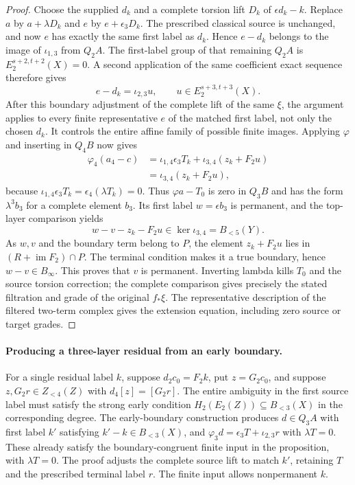 \begin{proof}
Choose the supplied $d_k$ and a complete torsion lift $D_k$ of
$\epsilon d_k-k$. Replace $a$ by $a+\lambda D_k$ and $e$ by
$e+\epsilon_3D_k$. The prescribed classical source is unchanged, and
now $e$ has exactly the same first label as $d_k$. Hence $e-d_k$ belongs
to the image of $\iota_{1,3}$ from $Q_2A$.
The first-label group of that remaining $Q_2A$ is
$E_2^{s+2,t+2}(X)=0$. A second application of the same coefficient
exact sequence therefore gives
\[
 e-d_k=\iota_{2,3}u,\qquad u\in E_2^{s+3,t+3}(X).
\]
After this boundary adjustment of the complete lift of the same $\xi$,
the argument applies to every finite representative $e$ of the matched
first label, not only the chosen $d_k$. It controls the entire affine
family of possible finite images.
Applying $\varphi$ and inserting in $Q_4B$ now gives
\[
 \begin{split}
 \varphi_4(a_4-c)
 &=\iota_{1,4}\epsilon_3T_k
   +\iota_{3,4}(z_k+F_2u)\\
 &=\iota_{3,4}(z_k+F_2u),
 \end{split}
\]
because $\iota_{1,4}\epsilon_3T_k=\epsilon_4(\lambda T_k)=0$.
Thus $\varphi a-T_0$ is zero in $Q_3B$ and has the form
$\lambda^3b_3$ for a complete element $b_3$.
Its first label $w=\epsilon b_3$ is permanent, and the top-layer
comparison yields
\[
 w-v-z_k-F_2u\in\ker\iota_{3,4}=B_{<5}(Y).
\]
As $w,v$ and the boundary term belong to $P$, the element
$z_k+F_2u$ lies in $\left(R+\operatorname{im}F_2\right)\cap P$.
The terminal condition makes it a true boundary, hence $w-v\in B_\infty$.
This proves that $v$ is permanent. Inverting lambda kills $T_0$ and the
source torsion correction; the complete comparison gives precisely the
stated filtration and grade of the original $f_*\xi$. The representative
description of the filtered two-term complex gives the extension equation,
including zero source or target grades.
\end{proof}


\paragraph{Producing a three-layer residual from an early boundary.}
For a single residual label $k$, suppose
$d_2c_0=F_2k$, put $z=G_2c_0$, and suppose
$z,G_2r\in Z_{<4}(Z)$ with $d_4[z]=[G_2r]$.
The entire ambiguity in the first source label must satisfy the strong early condition
$H_2(E_2(Z))\subseteq B_{<3}(X)$ in the corresponding degree.
The early-boundary construction produces $d\in Q_3A$ with
first label $k'$ satisfying $k'-k\in B_{<3}(X)$, and
$\varphi_3d=\epsilon_3T+\iota_{2,3}r$ with $\lambda T=0$.
These already satisfy the boundary-congruent finite input in the
proposition, with $\lambda T=0$. The proof adjusts the complete source lift to match $k'$, retaining $T$
and the prescribed terminal label $r$. The finite input allows
nonpermanent $k$.
